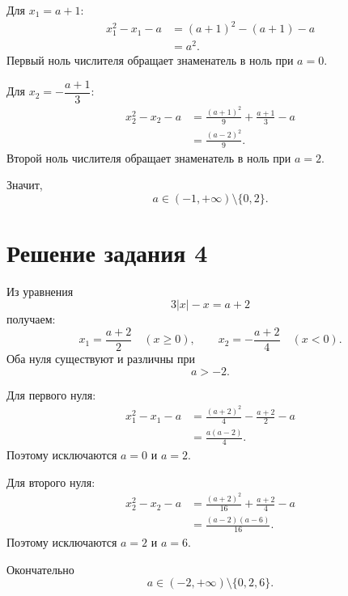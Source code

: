 \begin{teacheranswer}
  Для \(x_1=a+1\):
  \[
    \begin{aligned}
      x_1^2-x_1-a
      &=(a+1)^2-(a+1)-a\\
      &=a^2.
    \end{aligned}
  \]
  Первый ноль числителя обращает знаменатель в ноль при \(a=0\).

  Для \(x_2=-\dfrac{a+1}{3}\):
  \[
    \begin{aligned}
      x_2^2-x_2-a
      &=\frac{(a+1)^2}{9}+\frac{a+1}{3}-a\\
      &=\frac{(a-2)^2}{9}.
    \end{aligned}
  \]
  Второй ноль числителя обращает знаменатель в ноль при \(a=2\).

  Значит,
  \[
    \boxed{a\in(-1,+\infty)\setminus\{0,2\}}.
  \]
\end{teacheranswer}

\clearpage
\section*{Решение задания 4}

\begin{teacheranswer}
  Из уравнения
  \[
    3|x|-x=a+2
  \]
  получаем:
  \[
    x_1=\frac{a+2}{2}\quad(x\ge0),
    \qquad
    x_2=-\frac{a+2}{4}\quad(x<0).
  \]
  Оба нуля существуют и различны при
  \[
    a>-2.
  \]
\end{teacheranswer}

\begin{teacheranswer}
  Для первого нуля:
  \[
    \begin{aligned}
      x_1^2-x_1-a
      &=\frac{(a+2)^2}{4}-\frac{a+2}{2}-a\\
      &=\frac{a(a-2)}4.
    \end{aligned}
  \]
  Поэтому исключаются \(a=0\) и \(a=2\).

  Для второго нуля:
  \[
    \begin{aligned}
      x_2^2-x_2-a
      &=\frac{(a+2)^2}{16}+\frac{a+2}{4}-a\\
      &=\frac{(a-2)(a-6)}{16}.
    \end{aligned}
  \]
  Поэтому исключаются \(a=2\) и \(a=6\).

  Окончательно
  \[
    \boxed{a\in(-2,+\infty)\setminus\{0,2,6\}}.
  \]
\end{teacheranswer}

